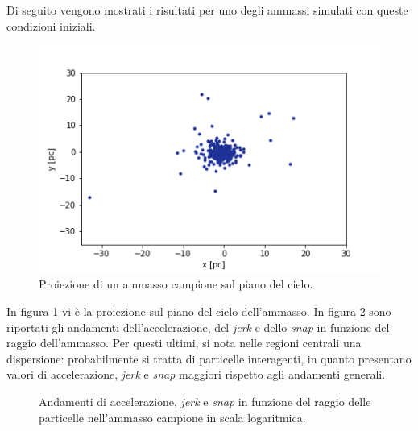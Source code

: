 Di seguito vengono mostrati i risultati per uno degli ammassi simulati con queste condizioni iniziali.
\begin{figure}[H]
\begin{center}
\includegraphics[width=0.5\columnwidth]{images/cluster_xy.png}
\end{center}
\caption{Proiezione di un ammasso campione sul piano del cielo.}
\label{fig:cluster}
\end{figure}
In figura \ref{fig:cluster} vi è la proiezione sul piano del cielo dell'ammasso. In figura \ref{fig:cluster1} sono riportati gli andamenti dell'accelerazione, del \textit{jerk} e dello \textit{snap} in funzione del raggio dell'ammasso. Per questi ultimi, si nota nelle regioni centrali una dispersione: probabilmente si tratta di particelle interagenti, in quanto presentano valori di accelerazione, \textit{jerk} e \textit{snap} maggiori rispetto agli andamenti generali. 
\begin{figure}[H]
\centering
{}
\qquad
{}
\qquad
{}
\caption{Andamenti di accelerazione, \textit{jerk} e \textit{snap} in funzione del raggio delle particelle nell'ammasso campione in scala logaritmica.}
\label{fig:cluster1}
\end{figure}
